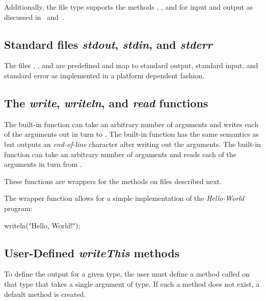 Additionally, the file type supports the
methods , , and  for input and
output as discussed in~ and~.

\subsection{Standard files {\em stdout}, {\em stdin}, and {\em stderr}}

The files , , and  are
predefined and map to standard output, standard input, and standard
error as implemented in a platform dependent fashion.

\subsection{The {\em write}, {\em writeln}, and {\em read} functions}

The built-in function  can take an arbitrary number of
arguments and writes each of the arguments out in turn
to .  The built-in function  has the same
semantics as  but outputs an {\em end-of-line} character
after writing out the arguments.  The built-in function 
can take an arbitrary number of arguments and reads each of the
arguments in turn from .

These functions are wrappers for the methods on files described next.

\begin{example}
The  wrapper function allows for a simple implementation
of the {\em Hello-World} program:
\begin{chapel}
writeln("Hello, World!");
\end{chapel}
\end{example}

\subsection{User-Defined {\em writeThis} methods}

To define the output for a given type, the user must define a method
called  on that type that takes a single argument of
 type.  If such a method does not exist, a default method is
created.

